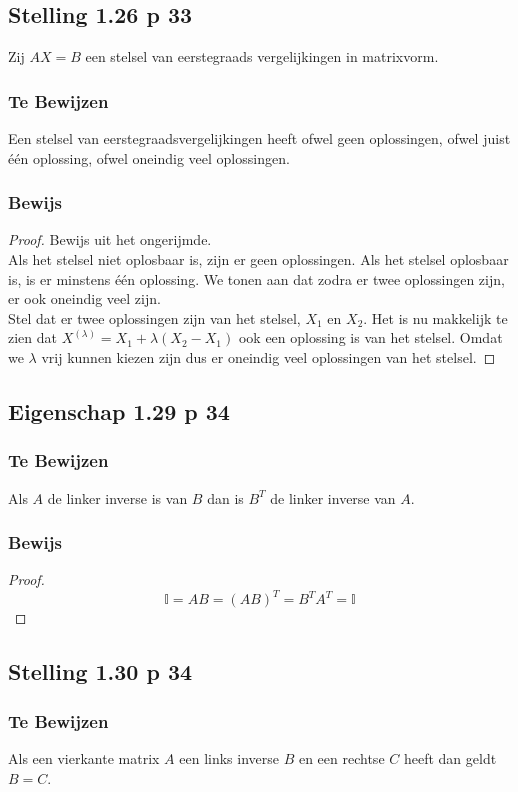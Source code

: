 \documentclass[lineaire_algebra_oplossingen.tex]{subfiles}
\begin{document}
\subsection{Stelling 1.26 p 33}
Zij $AX=B$ een stelsel van eerstegraads vergelijkingen in matrixvorm.
\subsubsection*{Te Bewijzen}
Een stelsel van eerstegraadsvergelijkingen heeft ofwel geen oplossingen, ofwel juist \'e\'en oplossing, ofwel oneindig veel oplossingen.
\subsubsection*{Bewijs}
\begin{proof}
Bewijs uit het ongerijmde.\\
Als het stelsel niet oplosbaar is, zijn er geen oplossingen. Als het stelsel oplosbaar is, is er minstens \'e\'en oplossing. We tonen aan dat zodra er twee oplossingen zijn, er ook oneindig veel zijn.\\
Stel dat er twee oplossingen zijn van het stelsel, $X_1$ en $X_2$. Het is nu makkelijk te zien dat $X^(\lambda) = X_1 + \lambda(X_2-X_1)$ ook een oplossing is van het stelsel. Omdat we $\lambda$ vrij kunnen kiezen zijn dus er oneindig veel oplossingen van het stelsel.
\end{proof}

\subsection{Eigenschap 1.29 p 34}
\subsubsection*{Te Bewijzen}
Als $A$ de linker inverse is van $B$ dan is $B^T$ de linker inverse van $A$.
\subsubsection*{Bewijs}
\begin{proof}
\[\mathbb{I} = AB= (AB)^T = B^TA^T = \mathbb{I}\]
\end{proof}

\subsection{Stelling 1.30 p 34}
\subsubsection*{Te Bewijzen}
Als een vierkante matrix $A$ een links inverse $B$ en een rechtse $C$ heeft dan geldt $B=C$.
\end{document}
